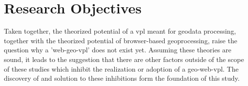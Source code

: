 




\section{Research Objectives}
Taken together, the theorized potential of a vpl meant for geodata processing, together with the theorized potential of browser-based geoprocessing, raise the question why a 'web-geo-vpl' does not exist yet. Assuming these theories are sound, it leads to the suggestion that there are other factors outside of the scope of these studies which inhibit the realization or adoption of a geo-web-vpl. 
The discovery of and solution to these inhibitions form the foundation of this study.








